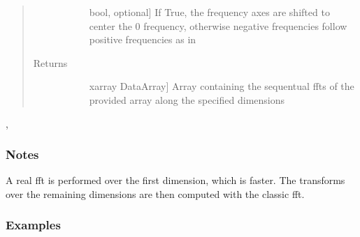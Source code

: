 \documentclass[letterpaper,10pt,english]{sphinxmanual}
\begin{document}
\begin{fulllineitems}
\begin{quote}
\begin{description}
\begin{description}
\item[{}] \leavevmode{[}bool, optional{]}
If True, the frequency axes are shifted to center the 0 frequency, otherwise negative                     frequencies follow positive frequencies as in 

\end{description}

\item[{Returns}] \leavevmode\begin{description}
\item[{}] \leavevmode{[}xarray DataArray{]}
Array containing the sequentual ffts of the provided array along the specified dimensions

\end{description}

\end{description}\end{quote}




, 


\subsubsection*{Notes}

A real fft is performed over the first dimension, which is faster. The transforms over the                 remaining dimensions are then computed with the classic fft.
\subsubsection*{Examples}


\end{fulllineitems}
\end{document}

